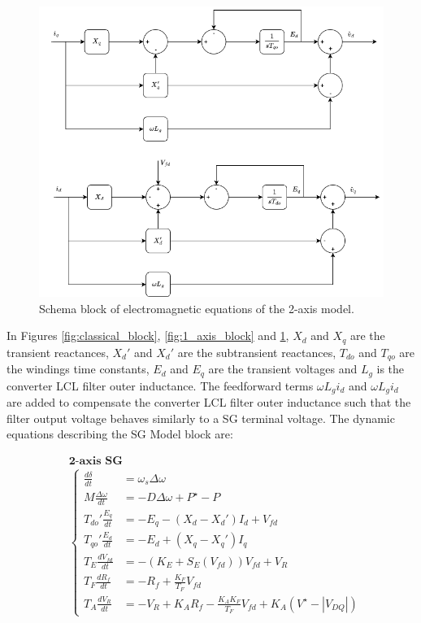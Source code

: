 \begin{figure}[ht!]
    \centering
    \includegraphics[width=12cm]{images/2_axis_block.png}
    \caption{Schema block of electromagnetic equations of the 2-axis model.}
    \label{fig:2_axis_block}
\end{figure}

In Figures \ref{fig:classical_block}, \ref{fig:1_axis_block} and
\ref{fig:2_axis_block}, $X_d$ and $X_q$ are the transient reactances, $X_d'$ and
$X_d'$ are the subtransient reactances, $T_{do}$ and $T_{qo}$ are the windings
time constants, $E_d$ and $E_q$ are the transient voltages and $L_g$ is the
converter LCL filter outer inductance. The feedforward terms $\omega L_gi_d$ and
$\omega L_gi_d$ are added to compensate the converter LCL filter outer
inductance such that the filter output voltage behaves similarly to a SG
terminal voltage. The dynamic equations describing the SG Model block are:

\begin{equation*}
    \begin{aligned}
        &\textbf{2-axis SG}\\
        &\begin{cases}
            \frac{d\delta}{dt} &= \omega_s \Delta\omega\\
            M\frac{\Delta\omega}{dt} &= -D\Delta\omega + P^{\star} - P\\
            T_{do}' \frac{E_q}{dt} &= -E_q - (X_d - X_d')I_d + V_{fd}\\
            T_{qo}' \frac{E_d}{dt} &= -E_d + (X_q - X_q')I_q\\
            T_E \frac{dV_{fd}}{dt} &= -\left(K_E + S_E(V_{fd})\right)V_{fd} + V_R \\
            T_F \frac{dR_f}{dt} &= -R_f + \frac{K_F}{T_F}V_{fd} \\
            T_A \frac{dV_R}{dt} &= -V_R + K_A R_f - \frac{K_A K_F}{T_F}V_{fd} + K_A (V^{\star} - |V_{DQ}|)
        \end{cases}
    \end{aligned}
\end{equation*}

